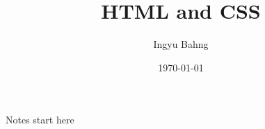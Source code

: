 \documentclass[10pt]{article}
\title{HTML and CSS}
\date{\today}
\author{Ingyu Bahng}
\begin{document}


Notes start here
  
\end{document}
